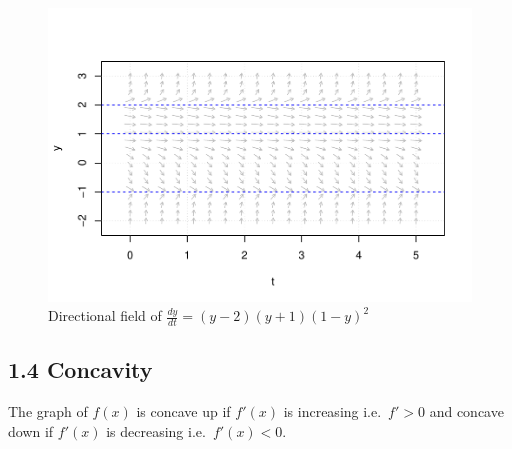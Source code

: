 \documentclass[
  11pt,
]{article}
\begin{document}
\begin{figure}
\centering
\includegraphics{differential_files/figure-latex/difference2-1.pdf}
\caption{Directional field of \(\frac{dy}{dt}=(y-2)(y+1)(1-y)^2\)}
\end{figure}

\subsection{1.4 Concavity}\label{concavity}

The graph of \(f(x)\) is concave up if \(f'(x)\) is increasing
i.e.~\(f'>0\) and concave down if \(f'(x)\) is decreasing
i.e.~\(f'(x)<0\).

\clearpage

\begin{figure}
\end{figure}
\end{document}

